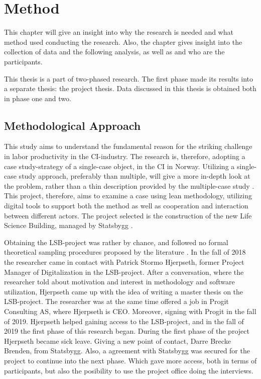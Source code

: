 
\chapter{Method} \label{chp:method}
This chapter will give an insight into why the research is needed and what method used conducting the research. Also, the chapter gives insight into the collection of data and the following analysis, as well as and who are the participants. 

This thesis is a part of two-phased research. The first phase made its results into a separate thesis: the project thesis. Data discussed in this thesis is obtained both in phase one and two. 

\section{Methodological Approach} \label{sec:purpose}
This study aims to understand the fundamental reason for the striking challenge in labor productivity in the CI-industry. The research is, therefore, adopting a case study-strategy of a single-case object, in the CI in Norway. Utilizing a single-case study approach, preferably than multiple, will give a more in-depth look at the problem, rather than a thin description provided by the multiple-case study \cite{yin1993case}. This project, therefore, aims to examine a case using lean methodology, utilizing digital tools to support both the method as well as cooperation and interaction between different actors. The project selected is the construction of the new Life Science Building, managed by Statsbygg \cite{statsbygg2019uio}. 

Obtaining the LSB-project was rather by chance, and followed no formal theoretical sampling procedures proposed by the literature \cite{yin1993case}. In the fall of 2018 the researcher came in contact with Patrick Stormo Hjerpseth, former Project Manager of Digitalization in the LSB-project. After a conversation, where the researcher told about motivation and interest in methodology and software utilization, Hjerpseth came up with the idea of writing a master thesis on the LSB-project. The researcher was at the same time offered a job in Progit Consulting AS, where Hjerpseth is CEO. Moreover, signing with Progit in the fall of 2019. Hjerpseth helped gaining access to the LSB-project, and in the fall of 2019 the first phase of this research began. During the first phase of the project Hjerpseth became sick leave. Giving a new point of contact, Darre Brecke Brenden, from Statsbygg. Also, a agreement with Statsbygg was secured for the project to continue into the next phase. Which gave more access, both in terms of participants, but also the posibility to use the project office doing the interviews.    

